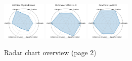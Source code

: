 \begin{figure}[ht!]
\includegraphics[width=0.1900\textwidth]{images/lhc_new_physics_dataset_radar.pdf}
\includegraphics[width=0.1900\textwidth]{images/mlcommons_medical_ai_radar.pdf}
\includegraphics[width=0.1900\textwidth]{images/calochallenge__radar.pdf}
\\[1ex]
\caption{Radar chart overview (page 2)}
\end{figure}


\clearpage

